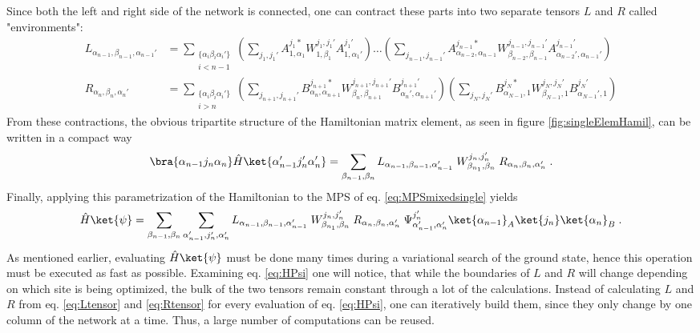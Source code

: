 Since both the left and right side of the network is connected, one can contract these parts into two separate tensors $L$ and $R$ called "environments":
\begin{align}
	L_{\alpha_{n-1}, \beta_{n-1} , \alpha_{n-1} '} &= \sum_{ \substack{ \{ \alpha_i \beta_i \alpha_i ' \} \\ i < n-1}} \left( \sum_{j_1 , j_1 '} A_{1 , \alpha_1}^{j_1 *} W_{1, \beta_1}^{j_1 , j_1 '} A_{1 , \alpha_1 '}^{j_1 '} \right) \ldots \left( \sum_{j_{n-1} , j_{n-1} '} A_{\alpha_{n-2} , \alpha_{n-1}}^{j_{n-1} *} W_{\beta_{n-2}, \beta_{n-1}}^{j_{n-1} , j_{n-1} '} A_{\alpha_{n-2} ' , \alpha_{n-1} '}^{j_{n-1} '} \right) \label{eq:Ltensor} \\
	R_{\alpha_{n} ,\beta_{n} , \alpha_{n} '} &= \sum_{ \substack{ \{ \alpha_i \beta_i \alpha_i ' \} \\ i > n}} \left( \sum_{j_{n+1} , j_{n+1} '} B_{\alpha_n , \alpha_{n+1}}^{j_{n+1} *} W_{\beta_n, \beta_{n+1}}^{j_{n+1} , j_{n+1} '} B_{\alpha_n ', \alpha_{n+1} '}^{j_{n+1} '} \right) \left( \sum_{j_{N} , j_{N} '} B_{\alpha_{N-1} , 1}^{j_{N} *} W_{\beta_{N-1}, 1}^{j_{N} , j_{N} '} B_{\alpha_{N-1}' , 1 }^{j_{N} '} \right) \label{eq:Rtensor}
\end{align}
From these contractions, the obvious tripartite structure of the Hamiltonian matrix element, as seen in figure \ref{fig:singleElemHamil}, can be written in a compact way
\begin{equation}
	\bra{\alpha_{n-1} j_n \alpha_{n}} \hat{H} \ket{\alpha_{n-1} ' j_n ' \alpha_{n} '} = \sum_{\beta_{n-1} , \beta_{n}} L_{\alpha_{n-1}, \beta_{n-1} , \alpha_{n-1} '} \; W_{\beta_{n_1}, \beta_n}^{j_n , j_n '} \; R_{\alpha_{n} ,\beta_{n} , \alpha_{n} '} \; .
\end{equation}
Finally, applying this parametrization of the Hamiltonian to the MPS of eq. \eqref{eq:MPSmixedsingle} yields \cite{schollwock}
\begin{equation}
	\hat{H} \ket{\psi} = \sum_{\beta_{n-1} , \beta_{n}} \sum_{\alpha_{n-1}' , j_n ', \alpha_{n}'} L_{\alpha_{n-1}, \beta_{n-1} , \alpha_{n-1} '} \; W_{\beta_{n_1}, \beta_n}^{j_n , j_n '} \; R_{\alpha_{n} ,\beta_{n} , \alpha_{n} '} \; \Psi_{\alpha_{n-1} ' , \alpha_{n} '}^{j_n '} \ket{\alpha_{n-1}}_A \ket{j_n} \ket{\alpha_{n}}_B \; .
	\label{eq:HPsi}
\end{equation}
As mentioned earlier, evaluating $\hat{H} \ket{\psi}$ must be done many times during a variational search of the ground state, hence this operation must be executed as fast as possible. Examining eq. \eqref{eq:HPsi} one will notice, that while the boundaries of $L$ and $R$ will change depending on which site is being optimized, the bulk of the two tensors remain constant through a lot of the calculations. Instead of calculating $L$ and $R$ from eq. \eqref{eq:Ltensor} and \eqref{eq:Rtensor} for every evaluation of eq. \eqref{eq:HPsi}, one can iteratively build them, since they only change by one column of the network at a time. Thus, a large number of computations can be reused.\\
